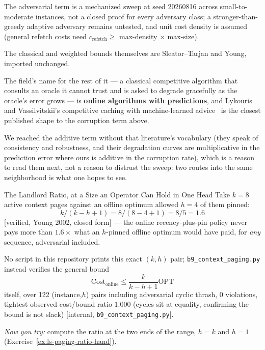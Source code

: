 \documentclass[11pt,a4paper]{article}
\theoremstyle{definition}
\theoremstyle{plain}
\begin{document}
\begin{pdboundary}
\setlength{\parskip}{4pt plus 1pt}
The adversarial term is a mechanized sweep at seed 20260816 across small-to-moderate
instances, not a closed proof for every adversary class; a stronger-than-greedy
adaptive adversary remains untested, and unit cost density is assumed (general
refetch costs need $c_{\mathrm{refetch}}\ge$ max-density $\times$ max-size).

The
classical and weighted bounds themselves are Sleator--Tarjan and Young, imported
unchanged.

The field's name for the rest of it --- a classical competitive
algorithm that consults an oracle it cannot trust and is asked to degrade
gracefully as the oracle's error grows --- is \textbf{online algorithms with
predictions}, and Lykouris and Vassilvitskii's competitive caching with
machine-learned advice~ is the closest published shape to
the corruption term above.

We reached the additive term without that
literature's vocabulary (they speak of consistency and robustness, and their
degradation curves are multiplicative in the prediction error where ours is
additive in the corruption rate), which is a reason to read them next, not a
reason to distrust the sweep: two routes into the same neighborhood is what
one hopes to see.
\end{pdboundary}

\begin{pdexample}{The Landlord Ratio, at a Size an Operator Can Hold in One Head}
\setlength{\parskip}{4pt plus 1pt}
Take $k=8$ active context pages against an offline optimum allowed $h=4$ of them pinned:
\[
k/(k-h+1)=8/(8-4+1)=8/5=1.6
\]
[verified, Young 2002, closed form] --- the online recency-plus-pin policy never pays more than $1.6\times$ what an $h$-pinned offline optimum would have paid, for \emph{any} sequence, adversarial included.

No script in this repository prints this exact $(k,h)$ pair; \texttt{b9\_context\_paging.py} instead verifies the general bound
\[
\mathrm{Cost}_{\mathrm{online}}\le\frac{k}{k-h+1}\mathrm{OPT}
\]
itself, over 122 (instance,$h$) pairs including adversarial cyclic thrash, 0 violations, tightest observed cost/bound ratio $1.000$ (cycles sit at equality, confirming the bound is not slack) [internal, \texttt{b9\_context\_paging.py}].

\emph{Now you try:} compute the ratio at the two ends of the range, $h=k$ and $h=1$ (Exercise~\ref{ex:ls-paging-ratio-hand}).
\end{pdexample}
\end{document}
